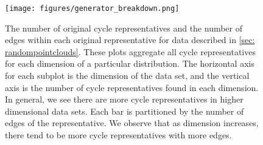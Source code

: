 \begin{figure}[h!]
\begin{center}
\texttt{[image: figures/generator\_breakdown.png]}%
\end{center}
\caption{The number of original cycle representatives and the number of edges within each original representative for data described in \se \ref{sec: randompointclouds}. These plots aggregate all cycle representatives for each dimension of a particular distribution. The horizontal axis for each subplot is the dimension of the data set, and the vertical axis is the number of cycle representatives found in each dimension. In general, we see there are more cycle representatives in higher dimensional data sets. Each bar is partitioned by the number of edges of the representative. We observe that as dimension increases, there tend to be more cycle representatives with more edges. %
}\label{fig:gen_num_breakdown}
\end{figure}